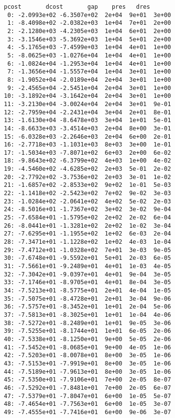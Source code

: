 \documentclass[11pt]{article}
\begin{document}
    \begin{Verbatim}[commandchars=\\\{\}]
     pcost       dcost       gap    pres   dres
 0: -2.0993e+02 -6.3507e+02  2e+04  9e+01  3e+00
 1: -8.4098e+02 -2.0382e+03  1e+04  7e+01  2e+00
 2: -2.1280e+03 -4.2305e+03  1e+04  6e+01  2e+00
 3: -3.1546e+03 -5.3692e+03  1e+04  5e+01  2e+00
 4: -5.1765e+03 -7.4599e+03  1e+04  4e+01  1e+00
 5: -8.0625e+03 -1.0276e+04  1e+04  4e+01  1e+00
 6: -1.0824e+04 -1.2953e+04  1e+04  4e+01  1e+00
 7: -1.3656e+04 -1.5557e+04  1e+04  3e+01  1e+00
 8: -1.9052e+04 -2.0189e+04  2e+04  3e+01  1e+00
 9: -2.4565e+04 -2.5451e+04  2e+04  3e+01  1e+00
10: -3.1892e+04 -3.1642e+04  2e+04  3e+01  1e+00
11: -3.2130e+04 -3.0024e+04  2e+04  3e+01  9e-01
12: -2.7959e+04 -2.2431e+04  3e+04  2e+01  8e-01
13: -1.6130e+04 -8.6478e+03  3e+04  1e+01  5e-01
14: -8.6633e+03 -3.4514e+03  2e+04  8e+00  3e-01
15: -6.0328e+03 -2.2646e+03  2e+04  6e+00  2e-01
16: -2.7718e+03 -1.1031e+03  8e+03  3e+00  1e-01
17: -1.5034e+03 -7.8071e+02  6e+03  2e+00  6e-02
18: -9.8643e+02 -6.3799e+02  4e+03  1e+00  4e-02
19: -4.5460e+02 -4.6285e+02  2e+03  5e-01  2e-02
20: -2.7792e+02 -3.7536e+02  2e+03  3e-01  1e-02
21: -1.6857e+02 -2.8533e+02  9e+02  1e-01  5e-03
22: -1.1418e+02 -2.5423e+02  7e+02  9e-02  3e-03
23: -1.0284e+02 -2.0641e+02  4e+02  5e-02  2e-03
24: -8.5016e+01 -1.7367e+02  3e+02  3e-02  9e-04
25: -7.6584e+01 -1.5795e+02  2e+02  2e-02  6e-04
26: -8.0441e+01 -1.3281e+02  2e+02  1e-02  3e-04
27: -7.6295e+01 -1.1955e+02  1e+02  6e-03  2e-04
28: -7.3471e+01 -1.1228e+02  1e+02  4e-03  1e-04
29: -7.4712e+01 -1.0328e+02  7e+01  3e-03  9e-05
30: -7.6748e+01 -9.5592e+01  5e+01  2e-03  6e-05
31: -7.5661e+01 -9.2489e+01  4e+01  1e-03  4e-05
32: -7.3042e+01 -9.0397e+01  4e+01  9e-04  3e-05
33: -7.1746e+01 -8.9705e+01  4e+01  8e-04  3e-05
34: -7.5213e+01 -8.5775e+01  2e+01  4e-04  1e-05
35: -7.5075e+01 -8.4728e+01  2e+01  3e-04  9e-06
36: -7.5757e+01 -8.3452e+01  1e+01  2e-04  5e-06
37: -7.5813e+01 -8.3025e+01  1e+01  1e-04  4e-06
38: -7.5272e+01 -8.2489e+01  1e+01  9e-05  3e-06
39: -7.5255e+01 -8.1744e+01  1e+01  6e-05  2e-06
40: -7.5338e+01 -8.1250e+01  9e+00  5e-05  2e-06
41: -7.5452e+01 -8.0685e+01  9e+00  4e-05  1e-06
42: -7.5203e+01 -8.0078e+01  8e+00  3e-05  1e-06
43: -7.5153e+01 -7.9919e+01  8e+00  3e-05  1e-06
44: -7.5189e+01 -7.9613e+01  8e+00  3e-05  1e-06
45: -7.5350e+01 -7.9106e+01  7e+00  2e-05  8e-07
46: -7.5292e+01 -7.8481e+01  7e+00  2e-05  6e-07
47: -7.5379e+01 -7.8047e+01  6e+00  1e-05  5e-07
48: -7.4654e+01 -7.7563e+01  6e+00  1e-05  3e-07
49: -7.4555e+01 -7.7416e+01  6e+00  9e-06  3e-07

\end{Verbatim}
\end{document}
